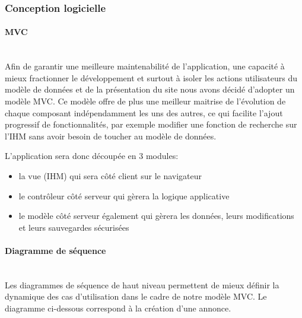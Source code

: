 \documentclass[a4paper,11pt]{article}
\begin{document}
\subsubsection{Conception logicielle}
\paragraph{MVC}\mbox{} \\

Afin de garantir une meilleure maintenabilité de l'application, une capacité à mieux fractionner le développement
et surtout à isoler les actions utilisateurs du modèle de données et de la présentation du site nous avons décidé
d'adopter un modèle MVC. Ce modèle offre de plus une meilleur maitrise de l'évolution de chaque composant
indépendamment les uns des autres, ce qui facilite l'ajout progressif de fonctionnalités, par exemple modifier
une fonction de recherche sur l'IHM sans avoir besoin de toucher au modèle de données.

L'application sera donc découpée en 3 modules:
\begin{itemize}
  \item la vue (IHM) qui sera côté client sur le navigateur
  \item le contrôleur côté serveur qui gèrera la logique applicative
  \item le modèle côté serveur également qui gèrera les données, leurs modifications et leurs sauvegardes sécurisées
\end{itemize}

\paragraph{Diagramme de séquence}\mbox{} \\
Les diagrammes de séquence de haut niveau permettent de mieux définir la dynamique des cas d'utilisation dans le cadre de notre
modèle MVC. Le diagramme ci-dessous correspond à la création d'une annonce. \\
\end{document}
